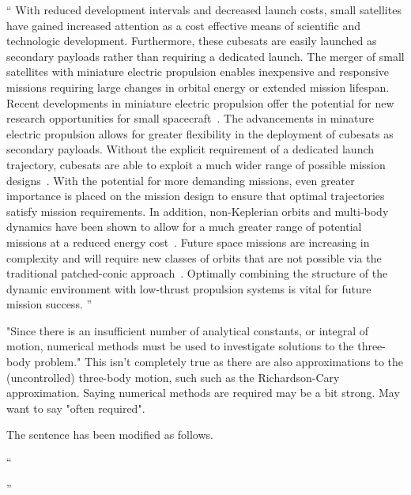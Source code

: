 \documentclass[11pt]{article}
\newenvironment{correction}{\begin{list}{}{\setlength{\leftmargin}{1cm}\setlength{\rightmargin}{1cm}}\vspace{\parsep}\item[]``}{''\end{list}}
\begin{document}
\begin{enumerate}
\begin{correction}
            With reduced development intervals and decreased launch costs, small satellites have gained increased attention as a cost effective means of scientific and technologic development. 
            Furthermore, these cubesats are easily launched as secondary payloads rather than requiring a dedicated launch.
            The merger of small satellites with miniature electric propulsion enables inexpensive and responsive missions requiring large changes in orbital energy or extended mission lifespan.
            Recent developments in miniature electric propulsion offer the potential for new research opportunities for small spacecraft~\cite{haque2013}.
            The advancements in minature electric propulsion allows for greater flexibility in the deployment of cubesats as secondary payloads.
            Without the explicit requirement of a dedicated launch trajectory, cubesats are able to exploit a much wider range of possible mission designs~\cite{folta2015}.
            With the potential for more demanding missions, even greater importance is placed on the mission design to ensure that optimal trajectories satisfy mission requirements. 
            In addition, non-Keplerian orbits and multi-body dynamics have been shown to allow for a much greater range of potential missions at a reduced energy cost~\cite{folta2015,koon2011}.
            Future space missions are increasing in complexity and will require new classes of orbits that are not possible via the traditional patched-conic approach~\cite{ross2006,gomez2001}.
            Optimally combining the structure of the dynamic environment with low-thrust propulsion systems is vital for future mission success.
        \end{correction}

\item 
    \begin{itshape}
"Since there is an insufficient number of analytical constants, or integral of motion, numerical methods must be used to investigate solutions to the three-body problem."  This isn't completely true as there are also approximations to the (uncontrolled) three-body motion, such such as the Richardson-Cary approximation.  Saying numerical methods are required may be a bit strong.  May want to say "often required".
\end{itshape}

The sentence has been modified as follows.

\begin{correction}


\end{correction}
\end{enumerate}
\end{document}

